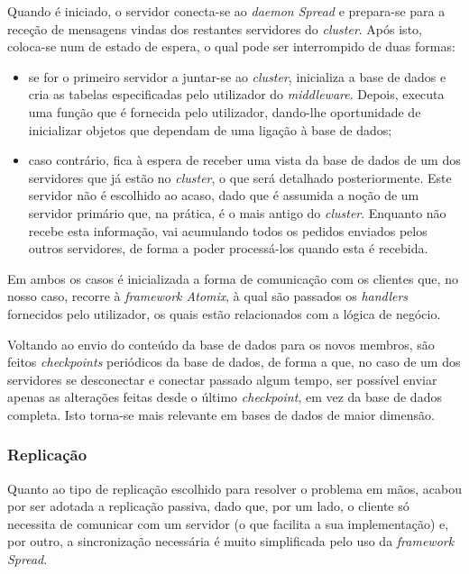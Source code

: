 \documentclass[a4paper]{report}
\begin{document}
{			Quando é iniciado, o servidor conecta-se ao \textit{daemon Spread} e prepara-se para a receção de mensagens vindas dos restantes servidores do \textit{cluster}. Após isto, coloca-se num de estado de espera, o qual pode ser interrompido de duas formas:
			\begin{itemize}
				\item se for o primeiro servidor a juntar-se ao \textit{cluster}, inicializa a base de dados e cria as tabelas especificadas pelo utilizador do \textit{middleware}. Depois, executa uma função que é fornecida pelo utilizador, dando-lhe oportunidade de inicializar objetos que dependam de uma ligação à base de dados;
				\item caso contrário, fica à espera de receber uma vista da base de dados de um dos servidores que já estão no \textit{cluster}, o que será detalhado posteriormente. Este servidor não é escolhido ao acaso, dado que é assumida a noção de um servidor primário que, na prática, é o mais antigo do \textit{cluster}. Enquanto não recebe esta informação, vai acumulando todos os pedidos enviados pelos outros servidores, de forma a poder processá-los quando esta é recebida.
			\end{itemize}
		
			Em ambos os casos é inicializada a forma de comunicação com os clientes que, no nosso caso, recorre à \textit{framework Atomix}, à qual são passados os \textit{handlers} fornecidos pelo utilizador, os quais estão relacionados com a lógica de negócio.
			
			Voltando ao envio do conteúdo da base de dados para os novos membros, são feitos \textit{checkpoints} periódicos da base de dados, de forma a que, no caso de um dos servidores se desconectar e conectar passado algum tempo, ser possível enviar apenas as alterações feitas desde o último \textit{checkpoint}, em vez da base de dados completa. Isto torna-se mais relevante em bases de dados de maior dimensão.

			\subsubsection{Replicação} \label{sssec:Replication}
				Quanto ao tipo de replicação escolhido para resolver o problema em mãos, acabou por ser adotada a replicação passiva, dado que, por um lado, o cliente só necessita de comunicar com um servidor (o que facilita a sua implementação) e, por outro, a sincronização necessária é muito simplificada pelo uso da \textit{framework Spread}.

}
\end{document}
